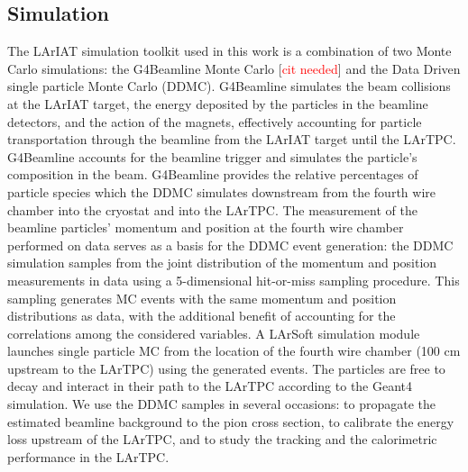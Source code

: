 \documentclass[aps,prl,twocolumn,showpacs,superscriptaddress,groupedaddress]{revtex4}  %
\begin{document}
\subsection{\label{sec:Simulation}Simulation}
The LArIAT simulation toolkit used in this work is a combination of two Monte Carlo simulations: the G4Beamline Monte Carlo  [\textcolor{red}{cit needed}] and the Data Driven single particle Monte Carlo (DDMC).  G4Beamline simulates the beam collisions at the LArIAT target, the energy deposited by the particles in the beamline detectors, and the action of the magnets, effectively accounting for particle transportation through the beamline from the LArIAT target until the LArTPC. G4Beamline accounts for the beamline trigger and simulates the particle's composition in the beam. G4Beamline provides the relative percentages of particle species which the DDMC simulates downstream from the fourth wire chamber into the cryostat and into the LArTPC.  The measurement of the beamline particles' momentum and position at the fourth wire chamber performed on data serves as a basis for the DDMC event generation: the DDMC simulation samples from the joint distribution of the momentum and position measurements in data using a 5-dimensional hit-or-miss sampling procedure. This sampling generates MC events  with the same momentum and position distributions as data, with the additional benefit of accounting for the correlations among the considered variables. A LArSoft simulation module launches single particle MC from the location of the fourth wire chamber (100 cm upstream to the LArTPC) using the generated events. The particles are free to decay and interact in their path to the LArTPC according to the Geant4 simulation. We use the DDMC samples in several occasions: to propagate the estimated beamline background to the pion cross section, to calibrate the energy loss upstream of the LArTPC,  and to study the tracking and the calorimetric performance  in the LArTPC. 
\end{document}
